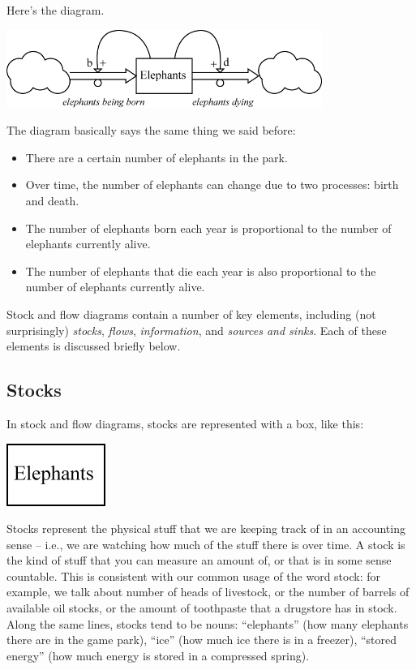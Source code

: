 Here's the diagram.

\beforefig
\centerline{\includegraphics[height=1in]{figs/ElephantStockAndFlow1}}
\afterfig

The diagram basically says the same thing we said before:

\begin{itemize}
\item There are a certain number of elephants in the park.
\item Over time, the number of elephants can change due to two processes: birth and death.
\item The number of elephants born each year is proportional to the number of elephants currently alive.
\item The number of elephants that die each year is also proportional to the number of elephants currently alive.
\end{itemize}

Stock and flow diagrams contain a number of key elements, including (not surprisingly) {\it stocks}, {\it flows}, {\it information}, and {\it sources and sinks}.  Each of these elements is discussed briefly below.


\subsection{Stocks}

In stock and flow diagrams, stocks are represented with a box, like this:

\beforefig
\centerline{\includegraphics[height=.5in]{figs/stock}}
\afterfig

Stocks represent the physical stuff that we are keeping track of in an accounting sense -- i.e., we are watching how much of the stuff there is over time. A stock is the kind of stuff that you can measure an amount of, or that is in some sense countable.  This is consistent with our common usage of the word stock:  for example, we talk about number of heads of livestock, or the number of barrels of available oil stocks, or the amount of toothpaste that a drugstore has in stock.  Along the same lines, stocks tend to be nouns:  ``elephants'' (how many elephants there are in the game park), ``ice'' (how much ice there is in a freezer), ``stored energy'' (how much energy is stored in a compressed spring).  

